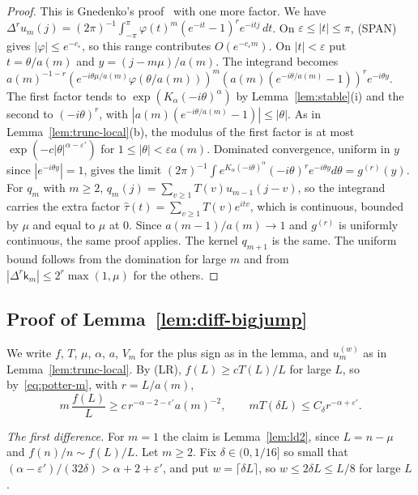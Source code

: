 \begin{proof}
This is Gnedenko's proof~\cite[Theorem~4.2.1]{ibragimovlinnik1971} with one more factor. We have
$\Delta^ru_m(j)=(2\pi)^{-1}\int_{-\pi}^\pi\varphi(t)^m(e^{-it}-1)^re^{-itj}\,dt$. On
$\varepsilon\le|t|\le\pi$, (SPAN) gives $|\varphi|\le e^{-c_\varepsilon}$, so this range
contributes $O(e^{-c_\varepsilon m})$. On $|t|<\varepsilon$ put $t=\theta/a(m)$ and
$y=(j-m\mu)/a(m)$. The integrand becomes
$a(m)^{-1-r}(e^{-i\theta\mu/a(m)}\varphi(\theta/a(m)))^m(a(m)(e^{-i\theta/a(m)}-1))^re^{-i\theta y}$.
The first factor tends to $\exp(K_\alpha(-i\theta)^\alpha)$ by Lemma~\ref{lem:stable}(i) and the
second to $(-i\theta)^r$, with $|a(m)(e^{-i\theta/a(m)}-1)|\le|\theta|$. As in
Lemma~\ref{lem:trunc-local}(b), the modulus of the first factor is at most
$\exp(-c|\theta|^{\alpha-\varepsilon'})$ for $1\le|\theta|<\varepsilon a(m)$. Dominated
convergence, uniform in $y$ since $|e^{-i\theta y}|=1$, gives the limit
$(2\pi)^{-1}\int e^{K_\alpha(-i\theta)^\alpha}(-i\theta)^re^{-i\theta y}d\theta=g^{(r)}(y)$. For $q_m$
with $m\ge2$, $q_m(j)=\sum_{v\ge1}T(v)u_{m-1}(j-v)$, so the integrand carries the extra factor
$\hat\tau(t)=\sum_{v\ge1}T(v)e^{itv}$, which is continuous, bounded by $\mu$ and equal to $\mu$
at $0$. Since $a(m-1)/a(m)\to1$ and $g^{(r)}$ is uniformly continuous, the same proof applies.
The kernel $q_{m+1}$ is the same. The uniform bound follows from the domination for large $m$
and from $|\Delta^r\mathsf k_m|\le2^r\max(1,\mu)$ for the others.
\end{proof}

\subsection{Proof of Lemma~\ref{lem:diff-bigjump}}\label{app:diff-bigjump}

We write $f$, $T$, $\mu$, $\alpha$, $a$, $V_m$ for the plus sign as in the lemma, and
$u^{(w)}_m$ as in Lemma~\ref{lem:trunc-local}. By (LR), $f(L)\ge cT(L)/L$ for large $L$, so
by~\eqref{eq:potter-m}, with $r=L/a(m)$,
\begin{equation}\label{eq:target}
 m\,\frac{f(L)}L\ge c\,r^{-\alpha-2-\varepsilon'}a(m)^{-2},\qquad mT(\delta L)\le C_\delta r^{-\alpha+\varepsilon'}.
\end{equation}

\emph{The first difference.} For $m=1$ the claim is Lemma~\ref{lem:ld2}, since $L=n-\mu$ and
$f(n)/n\sim f(L)/L$. Let $m\ge2$. Fix $\delta\in(0,1/16]$ so small that
$(\alpha-\varepsilon')/(32\delta)>\alpha+2+\varepsilon'$, and put $w=\lceil\delta L\rceil$, so
$w\le2\delta L\le L/8$ for large $L$.

